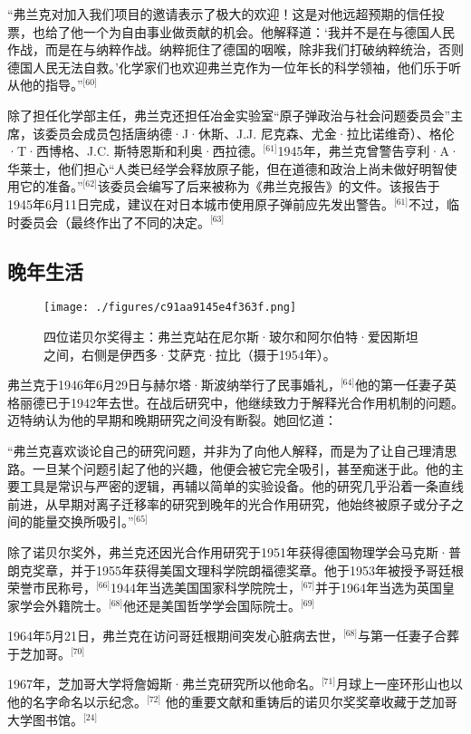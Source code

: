 “弗兰克对加入我们项目的邀请表示了极大的欢迎！这是对他远超预期的信任投票，也给了他一个为自由事业做贡献的机会。他解释道：‘我并不是在与德国人民作战，而是在与纳粹作战。纳粹扼住了德国的咽喉，除非我们打破纳粹统治，否则德国人民无法自救。’化学家们也欢迎弗兰克作为一位年长的科学领袖，他们乐于听从他的指导。”\(^\text{[60]}\)

除了担任化学部主任，弗兰克还担任冶金实验室“原子弹政治与社会问题委员会”主席，该委员会成员包括唐纳德·J·休斯、J.J. 尼克森、尤金·拉比诺维奇）、格伦·T·西博格、J.C. 斯特恩斯和利奥·西拉德。\(^\text{[61]}\)1945年，弗兰克曾警告亨利·A·华莱士，他们担心“人类已经学会释放原子能，但在道德和政治上尚未做好明智使用它的准备。”\(^\text{[62]}\)该委员会编写了后来被称为《弗兰克报告》的文件。该报告于1945年6月11日完成，建议在对日本城市使用原子弹前应先发出警告。\(^\text{[61]}\)不过，临时委员会（最终作出了不同的决定。\(^\text{[63]}\)
\subsection{晚年生活}
\begin{figure}[ht]
\centering
\texttt{[image: ./figures/c91aa9145e4f363f.png]}
\caption{四位诺贝尔奖得主：弗兰克站在尼尔斯·玻尔和阿尔伯特·爱因斯坦之间，右侧是伊西多·艾萨克·拉比（摄于1954年）。} \label{fig_ZMSflk_3}
\end{figure}
弗兰克于1946年6月29日与赫尔塔·斯波纳举行了民事婚礼，\(^\text{[64]}\)他的第一任妻子英格丽德已于1942年去世。在战后研究中，他继续致力于解释光合作用机制的问题。迈特纳认为他的早期和晚期研究之间没有断裂。她回忆道：

“弗兰克喜欢谈论自己的研究问题，并非为了向他人解释，而是为了让自己理清思路。一旦某个问题引起了他的兴趣，他便会被它完全吸引，甚至痴迷于此。他的主要工具是常识与严密的逻辑，再辅以简单的实验设备。他的研究几乎沿着一条直线前进，从早期对离子迁移率的研究到晚年的光合作用研究，他始终被原子或分子之间的能量交换所吸引。”\(^\text{[65]}\)

除了诺贝尔奖外，弗兰克还因光合作用研究于1951年获得德国物理学会马克斯·普朗克奖章，并于1955年获得美国文理科学院朗福德奖章。他于1953年被授予哥廷根荣誉市民称号，\(^\text{[66]}\)1944年当选美国国家科学院院士，\(^\text{[67]}\)并于1964年当选为英国皇家学会外籍院士。\(^\text{[68]}\)他还是美国哲学学会国际院士。\(^\text{[69]}\)

1964年5月21日，弗兰克在访问哥廷根期间突发心脏病去世，\(^\text{[68]}\)与第一任妻子合葬于芝加哥。\(^\text{[70]}\)

1967年，芝加哥大学将詹姆斯·弗兰克研究所以他命名。\(^\text{[71]}\)月球上一座环形山也以他的名字命名以示纪念。\(^\text{[72]}\) 他的重要文献和重铸后的诺贝尔奖奖章收藏于芝加哥大学图书馆。\(^\text{[24]}\)
